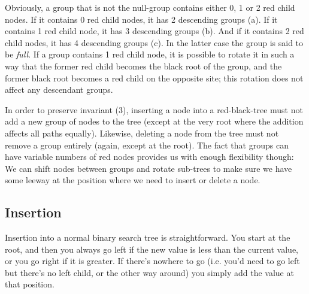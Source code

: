 \documentclass{article}
\begin{document}
Obviously, a group that is not the null-group contains either 0, 1 or 2 red child nodes.
If it contains 0 red child nodes, it has 2 descending groups (a). If it contains 1 red
child node, it has 3 descending groups (b). And if it contains 2 red child nodes, it has
4 descending groups (c). In the latter case the group is said to be \emph{full}. If a
group contains 1 red child node, it is possible to rotate it in such a way that the
former red child becomes the black root of the group, and the former black root becomes
a red child on the opposite site; this rotation does not affect any descendant groups.

In order to preserve invariant (3), inserting a node into a red-black-tree must
not add a new group of nodes to the tree (except at the very root where the addition
affects all paths equally). Likewise, deleting a node from the tree must not remove a
group entirely (again, except at the root). The fact that groups can have variable
numbers of red nodes provides us with enough flexibility though: We can shift nodes
between groups and rotate sub-trees to make sure we have some leeway at the position
where we need to insert or delete a node.

\subsection{Insertion}
Insertion into a normal binary search tree is straightforward. You start at the root,
and then you always go left if the new value is less than the current value, or you go
right if it is greater. If there's nowhere to go (i.e. you'd need to go left but there's
no left child, or the other way around) you simply add the value at that position.
\end{document}
